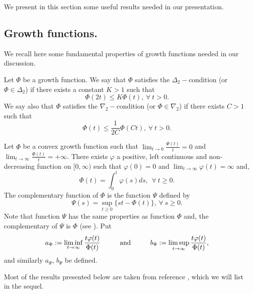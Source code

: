 \documentclass[a4paper,12pt,intlimits,oneside]{amsart}
\theoremstyle{definition}
\numberwithin{equation}{section}
\theoremstyle{definition}
\begin{document}
We present in this section some useful results needed in our presentation.

\subsection{Growth functions.} 


We  recall here some fundamental properties of growth functions needed in our discussion.

\medskip

Let  $\Phi$ be a growth function. We say that  $\Phi$ satisfies the $\Delta_{2}-$condition (or $\Phi \in \Delta_{2}$) if there exists a constant $K > 1$ such that
\begin{equation}\label{eq:delta2}
\Phi(2t) \leq K \Phi(t),~ \forall~ t >  0.\end{equation}
We say also that  $\Phi$ satisfies the $\nabla_{2}-$condition (or $\Phi \in \nabla_{2}$) if there exists $C > 1$ such that 
\begin{equation}\label{eq:delmta2}
\Phi(t) \leq \frac{1}{2C} \Phi(Ct),~ \forall~ t >  0.\end{equation}

Let  $\Phi$ be a convex growth function such that  $\lim_{t \to 0}\frac{\Phi(t)}{t}=0$ and $\lim_{t \to \infty}\frac{\Phi(t)}{t}=+\infty$. There exists  $\varphi$ a positive, left continuous and non-decreasing function on $[0, \infty)$ such that $\varphi(0)=0$ and $\lim_{t \to \infty}\varphi(t)=\infty$ and, 
$$   \Phi(t)=\int_{0}^{t}\varphi(s)ds, ~~\forall~t\geq 0.
  $$
The complementary function of $\Phi$ is the function $\Psi$ defined by
$$ \Psi(s)=\sup_{t\geq 0}\{st-\Phi(t) \}, ~ \forall~  s \geq 0.       $$
Note that function  $\Psi$ has the same properties as function $\Phi$ and, the complementary of $\Psi$ is $\Phi$ (see \cite{raoren}). Put
$$  a_\Phi:=\liminf_{t\to \infty}\frac{t\varphi(t)}{\Phi(t)}
   \hspace*{1cm}\textrm{and} \hspace*{1cm} b_\Phi:=\limsup_{t\to \infty}\frac{t\varphi(t)}{\Phi(t)}, $$
 and similarly $a_\Psi$, $b_\Psi$ be defined.


\medskip

Most of the results presented below are taken from reference \cite{djefeuto1}, which we will list in the sequel.
\end{document}
